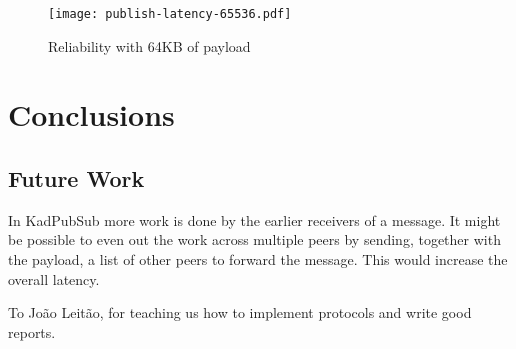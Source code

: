 \documentclass[sigconf]{acmart}
\begin{document}
\begin{figure}[htp]
    \centering
    \texttt{[image: publish-latency-65536.pdf]}
    \caption{Reliability with 64KB of payload}
    \label{fig:publish-latency-65536}
\end{figure}

\section{Conclusions}

\subsection{Future Work}
In KadPubSub more work is done by the earlier receivers of a message. It might be possible to even out the work across multiple peers by sending, together with the payload, a list of other peers to forward the message. This would increase the overall latency.

\begin{acks}
    To João Leitão, for teaching us how to implement protocols and write good reports.
	\end{acks}



\end{document}
